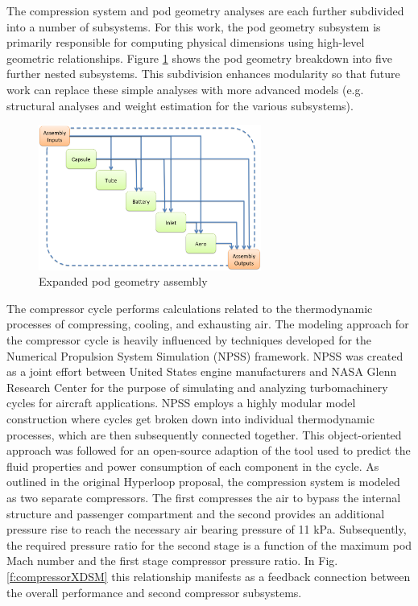 \documentclass[heading.tex]{subfiles}
\begin{document}
The compression system and pod geometry analyses are each further subdivided into a number of subsystems. For this work, the pod geometry 
subsystem is primarily responsible for computing physical dimensions using high-level geometric relationships.
 Figure \ref{f:podXDSM} shows the pod geometry breakdown into five further nested subsystems.
This subdivision enhances modularity so that future work can replace these simple analyses with more advanced models
(e.g. structural analyses and weight estimation for the various subsystems).

\begin{figure}[hbtp]
\centering
\includegraphics[width=0.65\textwidth]{images/podAssembly.png}
\caption{Expanded pod geometry assembly}
\label{f:podXDSM}
\end{figure}

The compressor cycle performs calculations related to the thermodynamic processes of compressing, cooling, and exhausting air. 
The modeling approach for the compressor cycle is heavily influenced by
techniques developed for the Numerical Propulsion System Simulation (NPSS) framework. 
NPSS was created as a joint effort between United States engine manufacturers and NASA Glenn Research Center for the purpose of 
simulating and analyzing turbomachinery cycles for aircraft applications\cite{Lytle}. NPSS employs a highly modular model construction
where cycles get broken down into individual thermodynamic processes, which are then subsequently connected together. 
This object-oriented approach was followed for
an open-source adaption of the tool used to predict the fluid properties and power consumption of each component in the cycle. 
As outlined in the original Hyperloop proposal, the compression system is modeled as two separate compressors.
The first compresses the air to bypass the internal structure and passenger compartment
and the second provides an additional pressure rise to reach the necessary air bearing pressure of 11 kPa. 
Subsequently, the required pressure ratio for the second stage is a function of the maximum pod Mach number
and the first stage compressor pressure ratio.
In Fig. \ref{f:compressorXDSM} this relationship manifests as a feedback
connection between the overall performance and second compressor subsystems. 
\end{document}
